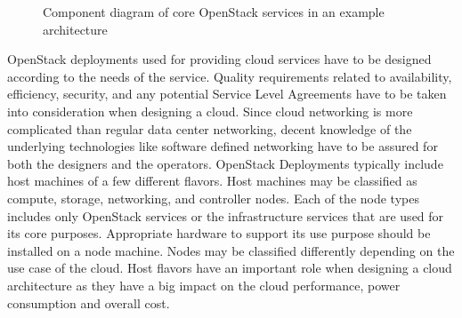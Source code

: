 \begin{figure}[t]
\centering


\caption{Component diagram of core OpenStack services in an example architecture}
\label{fig:openstack-services-component}
\end{figure}

OpenStack deployments used for providing cloud services have to be designed
according to the needs of the service. Quality requirements related to
availability, efficiency, security, and any potential Service Level Agreements
have to be taken into consideration when designing a cloud. Since cloud
networking is more complicated than regular data center networking, decent
knowledge of the underlying technologies like software defined networking have
to be assured for both the designers and the operators. OpenStack Deployments
typically include host machines of a few different flavors. Host machines may
be classified as compute, storage, networking, and controller nodes. Each of
the node types includes only OpenStack services or the infrastructure services
that are used for its core purposes. Appropriate hardware to support its use
purpose should be installed on a node machine. Nodes may be classified
differently depending on the use case of the cloud. Host flavors have an
important role when designing a cloud architecture as they have a big impact on
the cloud performance, power consumption and overall cost.

